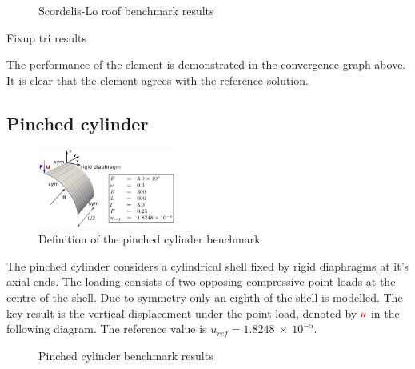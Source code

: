  
\begin{figure}[H]
	\caption{\label{ref_label_overall}Scordelis-Lo roof benchmark results}
\end{figure}

 

Fixup tri results

The performance of the element is demonstrated in the convergence graph above. It is clear that the element agrees with the reference solution.

\subsection{Pinched cylinder}

\begin{figure}
	\centering
	\includegraphics[width=0.4\textwidth]{images/pinchedcylinder.png}
	\caption{Definition of the pinched cylinder benchmark\cite{Bou13}}
\end{figure}

The pinched cylinder considers a cylindrical shell fixed by rigid diaphragms at it's axial ends. The loading consists of two opposing compressive point loads at the centre of the shell. Due to symmetry only an eighth of the shell is modelled. The key result is the vertical displacement under the point load, denoted by $\textcolor{red}{u}$ in the following diagram. The reference value is $u_{ref} =  1.8248\ \times\ 10^{-5}$. 

 
\begin{figure}[H]
	\caption{\label{ref_label_overall}Pinched cylinder benchmark results}
\end{figure}


